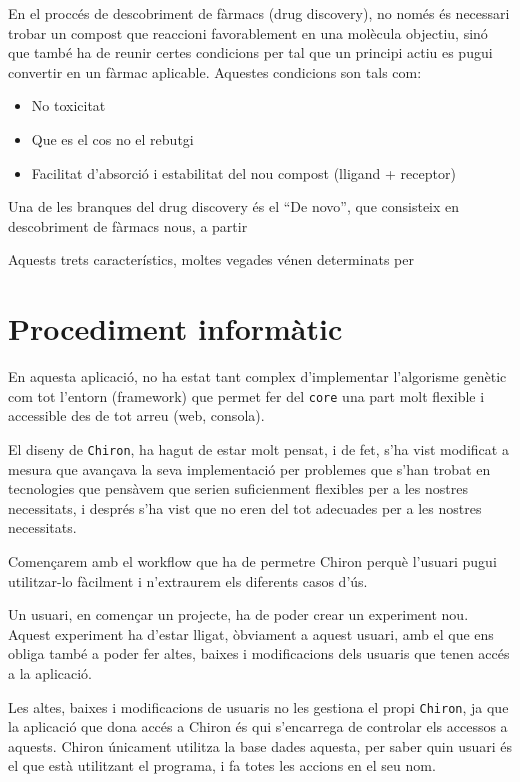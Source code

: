 \documentclass[titlepage,a4paper,12pt]{book}
\begin{document}
	En el proccés de descobriment de fàrmacs (drug discovery), no només és
	necessari trobar un compost que reaccioni favorablement en una molècula
	objectiu, sinó que també ha de reunir certes condicions per tal que un
	principi actiu es pugui convertir en un fàrmac aplicable.  Aquestes
	condicions son tals com:

	\begin{itemize}
		\item No toxicitat
		\item Que es el cos no el rebutgi
		\item Facilitat d'absorció i estabilitat del nou compost (lligand +
				receptor)
	\end{itemize}
	
	Una de les branques del drug discovery és el ``De novo'', que consisteix en
	descobriment de fàrmacs nous, a partir 

	Aquests trets característics, moltes vegades vénen determinats per 



\section{Procediment informàtic} %
\label{sec:Procediment informatic}

En aquesta aplicació, no ha estat tant complex d'implementar l'algorisme genètic
com tot l'entorn (framework) que permet fer del \texttt{core} una part molt
flexible i accessible des de tot arreu (web, consola).

El diseny de \texttt{Chiron}, ha hagut de estar molt pensat, i de fet, s'ha vist
modificat a mesura que avançava la seva implementació per problemes que s'han
trobat en tecnologies que pensàvem que serien suficienment flexibles per a les
nostres necessitats, i després s'ha vist que no eren del tot adecuades per a les
nostres necessitats.

Començarem amb el workflow que ha de permetre Chiron perquè l'usuari pugui
utilitzar-lo fàcilment i n'extraurem els diferents casos d'ús.

Un usuari, en començar un projecte, ha de poder crear un experiment nou.  Aquest
experiment ha d'estar lligat, òbviament a aquest usuari, amb el que ens obliga
també a poder fer altes, baixes i modificacions dels usuaris que tenen accés a
la aplicació.

Les altes, baixes i modificacions de usuaris no les gestiona el propi
\texttt{Chiron}, ja que la aplicació que dona accés a Chiron és qui s'encarrega
de controlar els accessos a aquests.  Chiron únicament utilitza la base dades
aquesta, per saber quin usuari és el que està utilitzant el programa, i fa totes
les accions en el seu nom.
\end{document}
